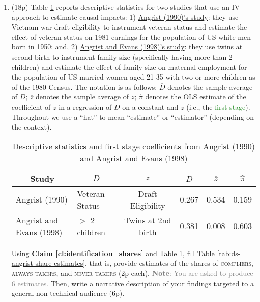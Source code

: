 \documentclass{article}
\begin{document}
\begin{enumerate}[label=\textbf{Q\arabic{enumi}}.,ref=Q\arabic{enumi}, wide=0pt, itemsep=0em, topsep=5pt, labelindent=0pt, resume]
\item (18p) Table \ref{tab:ds-angrist} reports descriptive statistics for two studies that use an IV approach to estimate causal impacts: 1) \href{https://www.jstor.org/stable/2006669}{Angrist (1990)'s study}: they use Vietnam war draft eligibility to instrument veteran status and estimate the effect of veteran status on 1981 earnings for the population of US white men born in 1950; and, 2) \href{https://www.jstor.org/stable/116844}{Angrist and Evans (1998)'s study}: they use twins at second birth to instrument family size (specifically having more than 2 children) and estimate the effect of family size on maternal employment for the population of US married women aged 21-35 with two or more children as of the 1980 Census. The notation is as follows: $\overline{D}$ denotes the sample average of $D$; $\overline{z}$ denotes the sample average of $z$; $\widehat{\pi }$ denotes the OLS estimate of the coefficient of $z$ in a regression of $D$ on a constant and $z$ (i.e., the \textcolor{ForestGreen}{first stage}). Throughout we use a ``hat'' to mean ``estimate'' or ``estimator'' (depending on the context). 

\begin{table}[H]
\centering
{\renewcommand{\arraystretch}{1.5}
\begin{tabular}{cccccc}
\hline\hline
\textbf{Study} & $D$ & $z$ & $\overline{D}$ & $\overline{z}$ & $\widehat{\pi}$ \\ \hline
\multicolumn{1}{l}{Angrist (1990)} & \multicolumn{1}{l}{Veteran Status} & 
Draft Eligibility & 0.267 & 0.534 & 0.159 \\ 
\multicolumn{1}{l}{Angrist and Evans (1998)} & \multicolumn{1}{l}{$>$ 2 children} & Twins at 2nd birth & 0.381 & 0.008 & 0.603 \\ 
\hline\hline
\end{tabular} 
} 
\caption{Descriptive statistics and first stage coefficients from Angrist (1990) and Angrist and Evans (1998)}
\label{tab:ds-angrist}
\end{table}

\noindent Using \textbf{Claim \ref{cl:identification_shares}} and Table \ref{tab:ds-angrist}, fill Table \ref{tab:ds-angrist-share-estimates}, that is, provide estimates of the shares of \textsc{compliers}, \textsc{always takers}, and \textsc{never takers} (2p each). \textcolor{gray}{\textbf{Note}: You are asked to produce 6 estimates.} Then, write a narrative description of your findings targeted to a general non-technical audience (6p). 


\end{enumerate}
\end{document}
